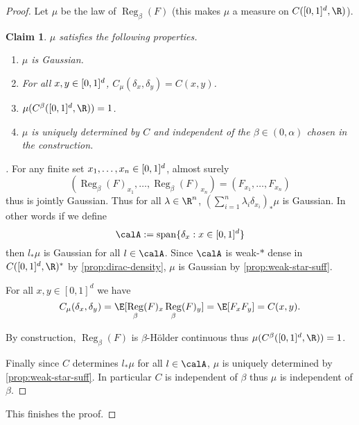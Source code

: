 \documentclass[fontsize=12pt, DIV=10]{scrreprt}
\theoremstyle{mydefn}
\newtheorem{claim}{Claim}
\theoremstyle{remark}
\newenvironment{subproof}[1][\proofname]{%
  \renewcommand{\qedsymbol}{$\blacksquare$}%
  \begin{proof}[#1]%
}{%
  \end{proof}%
}
\newcommand{\defeq}{:=}
\DeclareMathOperator{\reg}{Reg}
\DeclareMathOperator{\spn}{span}
\begin{document}
\begin{proof}
	Let $\mu$ be the law of $\reg_{\beta}(F)$ (this makes $\mu$ a measure on $C(\unitbox, \R)$). 
	\begin{claim}
		$\mu$ satisfies the following properties.
		\begin{enumerate}
			\item $\mu$ is Gaussian.
			\item For all $x, y \in [0,1]^d$, $C_{\mu}(\delta_x, \delta_y) = C(x, y)$.
			\item $\mu(C^{\beta}(\unitbox, \R)) = 1$.
			\item $\mu$ is uniquely determined by $C$ and independent of the $\beta \in (0, \alpha)$ chosen in the construction.
		\end{enumerate}
	\end{claim}
	\begin{subproof}
		For any finite set $x_1, \ldots, x_n \in [0,1]^d$, almost surely
		\begin{equation}
			(\reg_{\beta}(F)_{x_1}, \ldots, \reg_{\beta}(F)_{x_n})
			= (F_{x_1}, \ldots, F_{x_n})
		\end{equation}
		thus is jointly Gaussian. Thus for all $\lambda \in \R^n$, $(\sum_{i=1}^n \lambda_i \delta_{x_i})_* \mu$ is Gaussian. In other words if we define
		\begin{equation}
			\calA \defeq \spn\{ \delta_x : x \in [0, 1]^d\}
		\end{equation}
		then $l_* \mu$ is Gaussian for all $l \in \calA$. Since $\calA$ is weak-$*$ dense in $C([0, 1]^d, \R)^*$ by \vref{prop:dirac-density}, $\mu$ is Gaussian by \vref{prop:weak-star-suff}.

		For all $x, y \in [0, 1]^d$ we have
		\begin{equation}
			C_{\mu}(\delta_x, \delta_y) = \E[\reg_{\beta}(F)_x \reg_{\beta}(F)_y]
			= \E[F_x F_y] = C(x, y).
		\end{equation}

		By construction, $\reg_{\beta}(F)$ is $\beta$-H\"older continuous thus $\mu(C^{\beta}(\unitbox, \R)) = 1$.

		Finally since $C$ determines $l_* \mu$ for all $l \in \calA$, $\mu$ is uniquely determined by \vref{prop:weak-star-suff}. In particular $C$ is independent of $\beta$ thus $\mu$ is independent of $\beta$.
	\end{subproof}

	This finishes the proof.
\end{proof}
\end{document}
